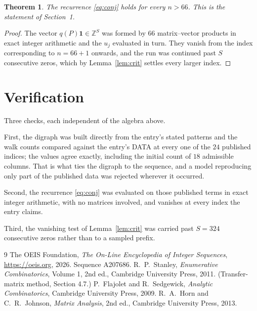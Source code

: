 \documentclass[11pt,a4paper]{article}
\theoremstyle{plain}
\newtheorem{theorem}{Theorem}
\theoremstyle{definition}
\begin{document}
\begin{theorem}
The recurrence \eqref{eq:conj} holds for every $n>66$. This is the statement of
Section~1.
\end{theorem}

\begin{proof}
The vector $q(P)\mathbf{1}\in\mathbb{Z}^{S}$ was formed by $66$ matrix--vector
products in exact integer arithmetic and the $u_j$ evaluated in turn. They vanish from the
index corresponding to $n=66+1$ onwards, and the run was continued past $S$ consecutive
zeros, which by Lemma~\ref{lem:crit} settles every larger index.
\end{proof}

\section{Verification}

Three checks, each independent of the algebra above.

First, the digraph was built directly from the entry's stated patterns and the walk counts
compared against the entry's DATA at every one of the $24$ published indices; the
values agree exactly, including the initial count of $18$ admissible columns. That is
what ties the digraph to the sequence, and a model reproducing only part of the published
data was rejected wherever it occurred.

Second, the recurrence \eqref{eq:conj} was evaluated on those published terms in exact
integer arithmetic, with no matrices involved, and vanishes at every index the entry claims.

Third, the vanishing test of Lemma~\ref{lem:crit} was carried past $S=324$ consecutive
zeros rather than to a sampled prefix.

\begin{thebibliography}{9}
 The OEIS Foundation, \emph{The On-Line Encyclopedia of Integer
Sequences}, \url{https://oeis.org}, 2026. Sequence A207686.
 R.~P.~Stanley, \emph{Enumerative Combinatorics}, Volume 1, 2nd ed.,
Cambridge University Press, 2011. (Transfer-matrix method, Section 4.7.)
 P.~Flajolet and R.~Sedgewick, \emph{Analytic Combinatorics}, Cambridge
University Press, 2009.
 R.~A.~Horn and C.~R.~Johnson, \emph{Matrix Analysis}, 2nd ed., Cambridge
University Press, 2013.
\end{thebibliography}
\end{document}
